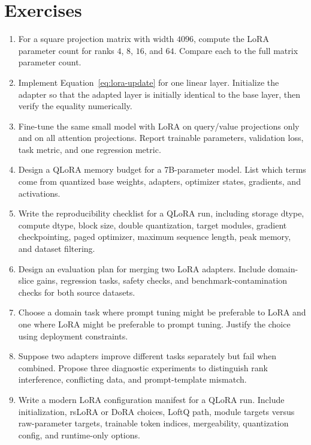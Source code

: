 \section{Exercises}
\label{sec:peft-exercises}

\begin{enumerate}
\item For a square projection matrix with width $4096$, compute the LoRA parameter count for ranks $4$, $8$, $16$, and $64$. Compare each to the full matrix parameter count.
\item Implement Equation~\ref{eq:lora-update} for one linear layer. Initialize the adapter so that the adapted layer is initially identical to the base layer, then verify the equality numerically.
\item Fine-tune the same small model with LoRA on query/value projections only and on all attention projections. Report trainable parameters, validation loss, task metric, and one regression metric.
\item Design a QLoRA memory budget for a 7B-parameter model. List which terms come from quantized base weights, adapters, optimizer states, gradients, and activations.
\item Write the reproducibility checklist for a QLoRA run, including storage dtype, compute dtype, block size, double quantization, target modules, gradient checkpointing, paged optimizer, maximum sequence length, peak memory, and dataset filtering.
\item Design an evaluation plan for merging two LoRA adapters. Include domain-slice gains, regression tasks, safety checks, and benchmark-contamination checks for both source datasets.
\item Choose a domain task where prompt tuning might be preferable to LoRA and one where LoRA might be preferable to prompt tuning. Justify the choice using deployment constraints.
\item Suppose two adapters improve different tasks separately but fail when combined. Propose three diagnostic experiments to distinguish rank interference, conflicting data, and prompt-template mismatch.
\item Write a modern LoRA configuration manifest for a QLoRA run. Include initialization, rsLoRA or DoRA choices, LoftQ path, module targets versus raw-parameter targets, trainable token indices, mergeability, quantization config, and runtime-only options.
\end{enumerate}
